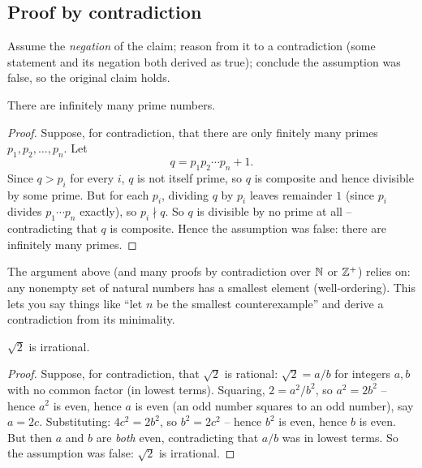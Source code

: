 \subsection{Proof by contradiction}
\label{sec:3-9}
\begin{note}[Pattern]
Assume the \emph{negation} of the claim; reason from it to a contradiction (some statement and its negation both derived as true); conclude the assumption was false, so the original claim holds.
\end{note}

\begin{example}
There are infinitely many prime numbers.
\end{example}
\begin{proof}
Suppose, for contradiction, that there are only finitely many primes $p_1,p_2,\dots,p_n$. Let
\[
q = p_1 p_2 \cdots p_n + 1.
\]
Since $q > p_i$ for every $i$, $q$ is not itself prime, so $q$ is composite and hence divisible by some prime. But for each $p_i$, dividing $q$ by $p_i$ leaves remainder $1$ (since $p_i$ divides $p_1\cdots p_n$ exactly), so $p_i \nmid q$. So $q$ is divisible by no prime at all -- contradicting that $q$ is composite. Hence the assumption was false: there are infinitely many primes.
\end{proof}

\begin{note}
The argument above (and many proofs by contradiction over $\mathbb{N}$ or $\mathbb{Z}^+$) relies on: any nonempty set of natural numbers has a smallest element (well-ordering). This lets you say things like ``let $n$ be the smallest counterexample'' and derive a contradiction from its minimality.
\end{note}

\begin{example}
$\sqrt{2}$ is irrational.
\end{example}
\begin{proof}
Suppose, for contradiction, that $\sqrt2$ is rational: $\sqrt2 = a/b$ for integers $a,b$ with no common factor (in lowest terms). Squaring, $2 = a^2/b^2$, so $a^2 = 2b^2$ -- hence $a^2$ is even, hence $a$ is even (an odd number squares to an odd number), say $a = 2c$. Substituting: $4c^2 = 2b^2$, so $b^2 = 2c^2$ -- hence $b^2$ is even, hence $b$ is even. But then $a$ and $b$ are \emph{both} even, contradicting that $a/b$ was in lowest terms. So the assumption was false: $\sqrt2$ is irrational.
\end{proof}

